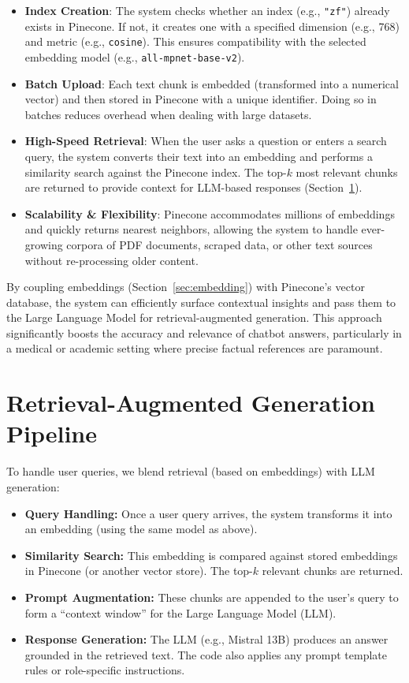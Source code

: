 \begin{itemize}
    \item \textbf{Index Creation}: The system checks whether an index (e.g., \texttt{"zf"}) already exists in Pinecone. If not, it creates one with a specified dimension (e.g., 768) and metric (e.g., \texttt{cosine}). This ensures compatibility with the selected embedding model (e.g., \texttt{all-mpnet-base-v2}).
    \item \textbf{Batch Upload}: Each text chunk is embedded (transformed into a numerical vector) and then stored in Pinecone with a unique identifier. Doing so in batches reduces overhead when dealing with large datasets.
    \item \textbf{High-Speed Retrieval}: When the user asks a question or enters a search query, the system converts their text into an embedding and performs a similarity search against the Pinecone index. The top-$k$ most relevant chunks are returned to provide context for LLM-based responses (Section~\ref{sec:rag-pipeline}).
    \item \textbf{Scalability \& Flexibility}: Pinecone accommodates millions of embeddings and quickly returns nearest neighbors, allowing the system to handle ever-growing corpora of PDF documents, scraped data, or other text sources without re-processing older content.
\end{itemize}

By coupling embeddings (Section~\ref{sec:embedding}) with Pinecone’s vector database, the system can efficiently surface contextual insights and pass them to the Large Language Model for retrieval-augmented generation. This approach significantly boosts the accuracy and relevance of chatbot answers, particularly in a medical or academic setting where precise factual references are paramount.


\section{Retrieval-Augmented Generation Pipeline}
\label{sec:rag-pipeline}
To handle user queries, we blend retrieval (based on embeddings) with LLM generation:
\begin{itemize}
    \item \textbf{Query Handling:} Once a user query arrives, the system transforms it into an embedding (using the same model as above).
    \item \textbf{Similarity Search:} This embedding is compared against stored embeddings in Pinecone (or another vector store). The top-$k$ relevant chunks are returned.
    \item \textbf{Prompt Augmentation:} These chunks are appended to the user’s query to form a “context window” for the Large Language Model (LLM).
    \item \textbf{Response Generation:} The LLM (e.g., Mistral 13B) produces an answer grounded in the retrieved text. The code also applies any prompt template rules or role-specific instructions.
\end{itemize}

